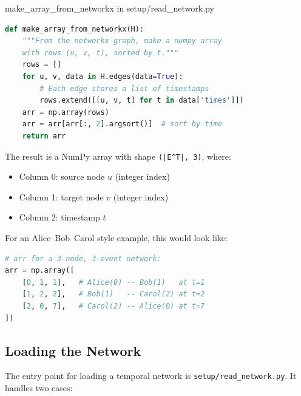 \begin{codewalk}{make\_array\_from\_networkx in setup/read\_network.py}
\begin{lstlisting}[language=Python]
def make_array_from_networkx(H):
    """From the networkx graph, make a numpy array
    with rows (u, v, t), sorted by t."""
    rows = []
    for u, v, data in H.edges(data=True):
        # Each edge stores a list of timestamps
        rows.extend([[u, v, t] for t in data['times']])
    arr = np.array(rows)
    arr = arr[arr[:, 2].argsort()]  # sort by time
    return arr
\end{lstlisting}

The result is a NumPy array with shape \texttt{(|E\^{}T|, 3)}, where:
\begin{itemize}[noitemsep]
  \item Column 0: source node $u$ (integer index)
  \item Column 1: target node $v$ (integer index)
  \item Column 2: timestamp $t$
\end{itemize}

For an Alice--Bob--Carol style example, this would look like:
\begin{lstlisting}[language=Python]
# arr for a 3-node, 3-event network:
arr = np.array([
    [0, 1, 1],   # Alice(0) -- Bob(1)   at t=1
    [1, 2, 2],   # Bob(1)   -- Carol(2) at t=2
    [2, 0, 7],   # Carol(2) -- Alice(0) at t=7
])
\end{lstlisting}
\end{codewalk}

\subsection{Loading the Network}

The entry point for loading a temporal network is \texttt{setup/read\_network.py}. It handles
two cases:

